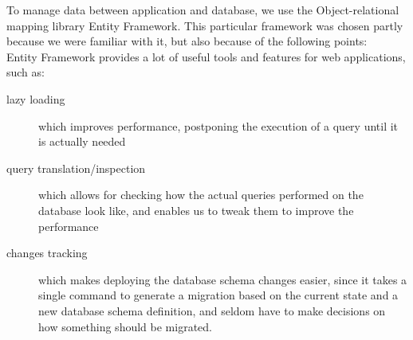 To manage data between application and database, we use the Object-relational mapping library Entity Framework. This particular framework was chosen partly because we were familiar with it, but also because of the following points: \\

\noindent Entity Framework provides a lot of useful tools and features for web applications, such as: 
\begin{description}
\item [lazy loading] which improves performance, postponing the execution of a query until it is actually needed
\item [query translation/inspection] which allows for checking how the actual queries performed on the database look like, and enables us to tweak them to improve the performance
\item [changes tracking] which makes deploying the database schema changes easier, since it takes a single command to generate a migration based on the current state and a new database schema definition, and seldom have to make decisions on how something should be migrated.
\end{description}